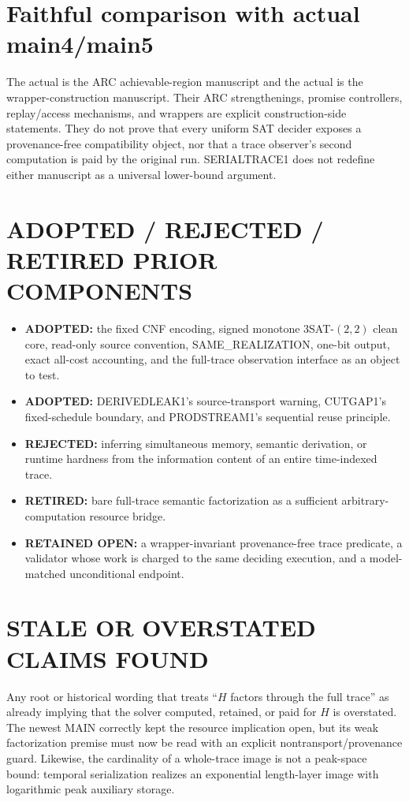 \documentclass[11pt]{article}
\begin{document}
\section{Faithful comparison with actual main4/main5}

The actual  is the ARC achievable-region manuscript and the
actual  is the wrapper-construction manuscript.  Their ARC
strengthenings, promise controllers, replay/access mechanisms, and wrappers
are explicit construction-side statements.  They do not prove that every
uniform SAT decider exposes a provenance-free compatibility object, nor that
a trace observer's second computation is paid by the original run.
SERIALTRACE1 does not redefine either manuscript as a universal lower-bound
argument.

\section{ADOPTED / REJECTED / RETIRED PRIOR COMPONENTS}

\begin{itemize}[leftmargin=*]
\item \textbf{ADOPTED:} the fixed CNF encoding, signed monotone
$3$SAT-$(2,2)$ clean core, read-only source convention, SAME\_REALIZATION,
one-bit output, exact all-cost accounting, and the full-trace observation
interface as an object to test.
\item \textbf{ADOPTED:} DERIVEDLEAK1's source-transport warning, CUTGAP1's
fixed-schedule boundary, and PRODSTREAM1's sequential reuse principle.
\item \textbf{REJECTED:} inferring simultaneous memory, semantic derivation,
or runtime hardness from the information content of an entire time-indexed
trace.
\item \textbf{RETIRED:} bare full-trace semantic factorization as a sufficient
arbitrary-computation resource bridge.
\item \textbf{RETAINED OPEN:} a wrapper-invariant provenance-free trace
predicate, a validator whose work is charged to the same deciding execution,
and a model-matched unconditional endpoint.
\end{itemize}

\section{STALE OR OVERSTATED CLAIMS FOUND}

Any root or historical wording that treats ``$H$ factors through the full
trace'' as already implying that the solver computed, retained, or paid for
$H$ is overstated.  The newest MAIN correctly kept the resource implication
open, but its weak factorization premise must now be read with an explicit
nontransport/provenance guard.  Likewise, the cardinality of a whole-trace
image is not a peak-space bound: temporal serialization realizes an
exponential length-layer image with logarithmic peak auxiliary storage.
\end{document}
